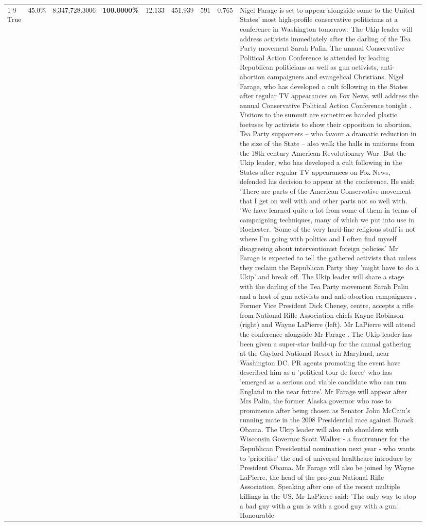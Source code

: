 \begin{table}[H]
\begin{tabular}{lllrlllll}
\cline{1-9}
True & 45.0\% & 8,347,728.3006 & \bfseries \color{red} 100.0000\% & 12.133 & 451.939 & 591 & 0.765 & Nigel Farage is set to appear alongside some to the United States' most high-profile conservative politicians at a conference in Washington tomorrow. The Ukip leader will address activists immediately after the darling of the Tea Party movement Sarah Palin. The annual Conservative Political Action Conference is attended by leading Republican politicians as well as gun activists, anti-abortion campaigners and evangelical Christians. Nigel Farage, who has developed a cult following in the States after regular TV appearances on Fox News, will address the annual Conservative Political Action Conference tonight . Visitors to the summit are sometimes handed plastic foetuses by activists to show their opposition to abortion. Tea Party supporters – who favour a dramatic reduction in the size of the State – also walk the halls in uniforms from the 18th-century American Revolutionary War. But the Ukip leader, who has developed a cult following in the States after regular TV appearances on Fox News, defended his decision to appear at the conference. He said: 'There are parts of the American Conservative movement that I get on well with and other parts not so well with. 'We have learned quite a lot from some of them in terms of campaigning techniques, many of which we put into use in Rochester. 'Some of the very hard-line religious stuff is not where I'm going with politics and I often find myself disagreeing about interventionist foreign policies.' Mr Farage is expected to tell the gathered activists that unless they reclaim the Republican Party they 'might have to do a Ukip' and break off. The Ukip leader will share a stage with the darling of the Tea Party movement Sarah Palin and a host of gun activists and anti-abortion campaigners . Former Vice President Dick Cheney, centre, accepts a rifle from National Rifle Association chiefs Kayne Robinson (right) and Wayne LaPierre (left). Mr LaPierre will attend the conference alongside Mr Farage . The Ukip leader has been given a super-star build-up for the annual gathering at the Gaylord National Resort in Maryland, near Washington DC. PR agents promoting the event have described him as a 'political tour de force' who has 'emerged as a serious and viable candidate who can run England in the near future'. Mr Farage will appear after Mrs Palin, the former Alaska governor who rose to prominence after being chosen as Senator John McCain's running mate in the 2008 Presidential race against Barack Obama. The Ukip leader will also rub shoulders with Wisconsin Governor Scott Walker - a frontrunner for the Republican Presidential nomination next year - who wants to 'prioritise' the end of universal healthcare introduce by President Obama. Mr Farage will also be joined by Wayne LaPierre, the head of the pro-gun National Rifle Association. Speaking after one of the recent multiple killings in the US, Mr LaPierre said: 'The only way to stop a bad guy with a gun is with a good guy with a gun.' Honourable \\

\end{tabular}
\end{table}
